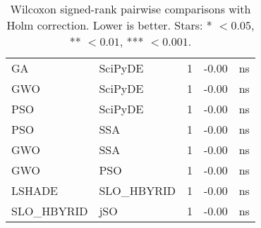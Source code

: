 \begin{table}[t]
\begin{tabular}{l l r r l}
GA & SciPyDE & 1 & -0.00 &  ns\\
GWO & SciPyDE & 1 & -0.00 &  ns\\
PSO & SciPyDE & 1 & -0.00 &  ns\\
PSO & SSA & 1 & -0.00 &  ns\\
GWO & SSA & 1 & -0.00 &  ns\\
GWO & PSO & 1 & -0.00 &  ns\\
LSHADE & SLO_HBYRID & 1 & -0.00 &  ns\\
SLO_HBYRID & jSO & 1 & -0.00 &  ns\\
\bottomrule
\end{tabular}
\caption{Wilcoxon signed-rank pairwise comparisons with Holm correction. Lower is better. Stars: * $<0.05$, ** $<0.01$, *** $<0.001$.}
\label{tab:wilcoxon}
\end{table}
